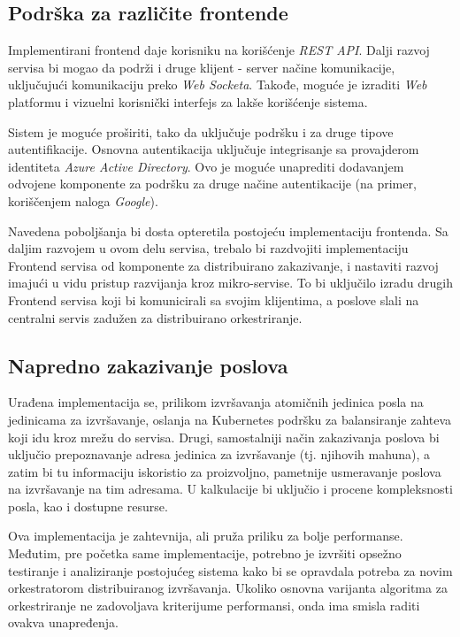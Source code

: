 \documentclass[12pt,oneside]{memoir}
\begin{document}
\subsection{Podrška za različite frontende}

Implementirani frontend daje korisniku na korišćenje \emph{REST API}. Dalji razvoj servisa bi mogao da podrži i druge klijent - server načine komunikacije, uključujući komunikaciju preko \emph{Web Socketa}. Takođe, moguće je izraditi \emph{Web} platformu i vizuelni korisnički interfejs za lakše korišćenje sistema.

Sistem je moguće proširiti, tako da uključuje podršku i za druge tipove autentifikacije. Osnovna autentikacija uključuje integrisanje sa provajderom identiteta \emph{Azure Active Directory}. Ovo je moguće unaprediti dodavanjem odvojene komponente za podršku za druge načine autentikacije (na primer, koriščenjem naloga \emph{Google}).

Navedena poboljšanja bi dosta opteretila postojeću implementaciju frontenda. Sa daljim razvojem u ovom delu servisa, trebalo bi razdvojiti implementaciju Frontend servisa od komponente za distribuirano zakazivanje, i nastaviti razvoj imajući u vidu pristup razvijanja kroz mikro-servise. To bi uključilo izradu drugih Frontend servisa koji bi komunicirali sa svojim klijentima, a poslove slali na centralni servis zadužen za distribuirano orkestriranje.

\subsection{Napredno zakazivanje poslova}

Urađena implementacija se, prilikom izvršavanja atomičnih jedinica posla na jedinicama za izvršavanje, oslanja na Kubernetes podršku za balansiranje zahteva koji idu kroz mrežu do servisa. Drugi, samostalniji način zakazivanja poslova bi uključio prepoznavanje adresa jedinica za izvršavanje (tj. njihovih mahuna), a zatim bi tu informaciju iskoristio za proizvoljno, pametnije usmeravanje poslova na izvršavanje na tim adresama. U kalkulacije bi uključio i procene kompleksnosti posla, kao i dostupne resurse.

Ova implementacija je zahtevnija, ali pruža priliku za bolje performanse. Međutim, pre početka same implementacije, potrebno je izvršiti opsežno testiranje i analiziranje postojućeg sistema kako bi se opravdala potreba za novim orkestratorom distribuiranog izvršavanja. Ukoliko osnovna varijanta algoritma za orkestriranje ne zadovoljava kriterijume performansi, onda ima smisla raditi ovakva unapređenja.
\end{document}
